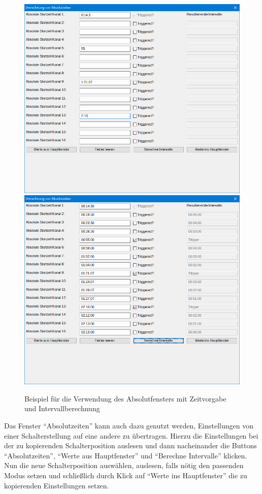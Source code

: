 \documentclass[paper=a4, open=any, numbers=noenddot]{scrbook}
\begin{document}
				\begin{figure}[tb]
					\begin{center}
						\includegraphics[width=.8\textwidth]{Bilder/beispielzeitvorgabe}{\\}\includegraphics[width=.8\textwidth]{Bilder/beispielabsolut}
					\end{center}
					\caption{Beispiel für die Verwendung des Absolutfensters mit Zeitvorgabe und Intervallberechnung}
					\label{fig:beispielabsolut}
				\end{figure}

				Das Fenster \enquote{Absolutzeiten} kann auch dazu genutzt werden, Einstellungen von einer Schalterstellung auf eine andere zu übertragen. Hierzu die Einstellungen bei der zu kopierenden Schalterposition auslesen und dann nacheinander die Buttons \enquote{Absolutzeiten}, \enquote{Werte aus Hauptfenster} und \enquote{Berechne Intervalle} klicken. Nun die neue Schalterposition auswählen, auslesen, falls nötig den passenden Modus setzen und schließlich durch Klick auf \enquote{Werte ins Hauptfenster} die zu kopierenden Einstellungen setzen.
\end{document}
